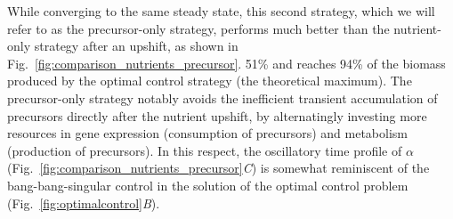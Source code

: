 While converging to the same steady state, this second strategy, which we will refer to as the precursor-only strategy, performs much better than the nutrient-only strategy after an upshift, as shown in Fig.~\ref{fig:comparison_nutrients_precursor}.
 51\% and reaches 94\% of the biomass produced by the optimal control strategy (the theoretical maximum).
The precursor-only strategy notably avoids the inefficient transient accumulation of precursors directly after the nutrient upshift, by alternatingly investing more resources in gene expression (consumption of precursors) and metabolism (production of precursors).
In this respect, the oscillatory time profile of $\alpha$ (Fig.~\ref{fig:comparison_nutrients_precursor}\textit{C}) is somewhat reminiscent of the bang-bang-singular control in the solution of the optimal control problem (Fig.~\ref{fig:optimalcontrol}\textit{B}).

